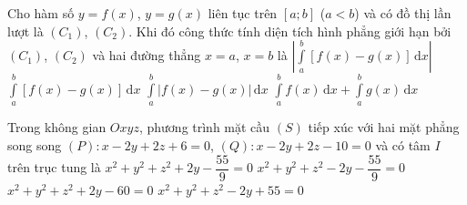 \begin{ex}%
	Cho hàm số $y = f\left(x\right)$, $y = g\left(x\right)$ liên tục trên $\left[a; b\right]$ ($a < b$) và có đồ thị lần lượt là $\left(C_1\right)$, $\left(C_2\right)$. Khi đó công thức tính diện tích hình phẳng giới hạn bởi $\left(C_1\right)$, $\left(C_2\right)$ và hai đường thẳng $x = a$, $x = b$ là
	\choice
	{$\left\vert\displaystyle\int\limits_{a}^{b}\left[f\left(x\right)- g\left(x\right) \right]\, \mathrm{d}x\right\vert$}
	{$\displaystyle\int\limits_{a}^{b}\left[f\left(x\right)- g\left(x\right) \right]\, \mathrm{d}x$}
	{\True $\displaystyle\int\limits_{a}^{b}\left\vert f\left(x\right)- g\left(x\right) \right\vert\, \mathrm{d}x$}
	{$\displaystyle\int\limits_{a}^{b}f\left(x\right)\, \mathrm{d}x + \displaystyle\int\limits_{a}^{b}g\left(x\right)\, \mathrm{d}x$}
\end{ex}


\begin{ex}%
Trong không gian $Oxyz$, phương trình mặt cầu $\left(S\right)$ tiếp xúc với hai mặt phẳng song song $\left(P\right)\colon x - 2y + 2z + 6 = 0$, $\left(Q\right)\colon x - 2y + 2z - 10 = 0$ và có tâm $I$ trên trục tung là
	\choice
	{\True $x^2 + y^2 + z^2 + 2y - \dfrac{55}{9} = 0$}
	{$x^2 + y^2 + z^2 - 2y - \dfrac{55}{9} = 0$}
	{$x^2 + y^2 + z^2 + 2y - 60 = 0$}
	{$x^2 + y^2 + z^2 - 2y + 55= 0$}
\end{ex}

